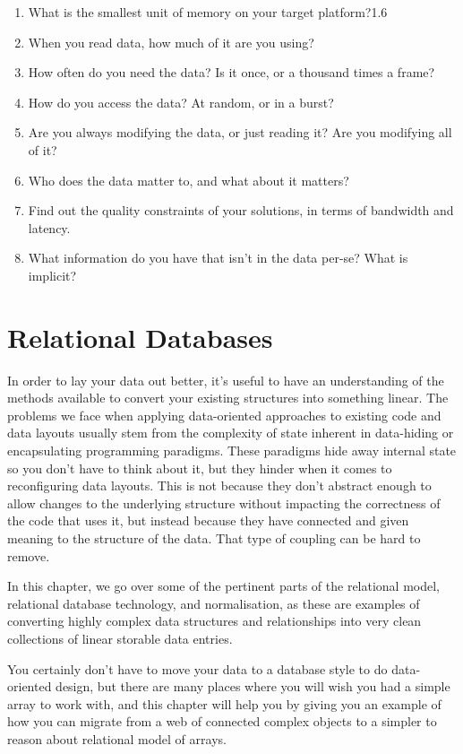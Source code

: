 \documentclass[a4paper,12pt]{book}
\begin{document}
\begin{enumerate}
      \item
            What is the smallest unit of memory on your target platform?1.6
      \item
            When you read data, how much of it are you using?
      \item
            How often do you need the data? Is it once, or a thousand times a frame?
      \item
            How do you access the data? At random, or in a burst?
      \item
            Are you always modifying the data, or just reading it? Are you modifying all of it?
      \item
            Who does the data matter to, and what about it matters?
      \item
            Find out the quality constraints of your solutions, in terms of bandwidth and latency.
      \item
            What information do you have that isn't in the data per-se? What is implicit?
\end{enumerate}

\newpage
\section{Relational Databases}

In order to lay your data out better, it's useful to have an understanding of the methods available to convert your existing structures into something linear.
The problems we face when applying data-oriented approaches to existing code and data layouts usually stem from the complexity of state inherent in data-hiding or encapsulating programming paradigms.
These paradigms hide away internal state so you don't have to think about it, but they hinder when it comes to reconfiguring data layouts.
This is not because they don't abstract enough to allow changes to the underlying structure without impacting the correctness of the code that uses it, but instead because they have connected and given meaning to the structure of the data.
That type of coupling can be hard to remove.

In this chapter, we go over some of the pertinent parts of the relational model, relational database technology, and normalisation, as these are examples of converting highly complex data structures and relationships into very clean collections of linear storable data entries.

You certainly don't have to move your data to a database style to do data-oriented design, but there are many places where you will wish you had a simple array to work with, and this chapter will help you by giving you an example of how you can migrate from a web of connected complex objects to a simpler to reason about relational model of arrays.
\end{document}

